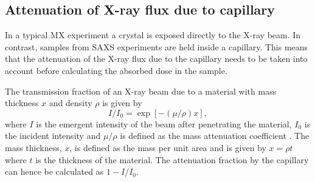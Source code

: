 \subsection{Attenuation of X-ray flux due to capillary}
\label{sub:Attenuation of X-ray flux due to capillary}
In a typical MX experiment a crystal is exposed directly to the X-ray beam.
In contrast, samples from SAXS experiments are held inside a capillary.
This means that the attenuation of the X-ray flux due to the capillary needs to be taken into account before calculating the absorbed dose in the sample.

The transmission fraction of an X-ray beam due to a material with mass thickness $x$ and density $\rho$ is given by
\begin{equation}
    I/I_0 = \exp \left[ -(\mu/\rho)x\right],
    \label{eq:capillary transmission fraction}
\end{equation}
where $I$ is the emergent intensity of the beam after penetrating the material, $I_0$ is the incident intensity and $\mu/\rho$ is defined as the mass attenuation coefficient \cite{hubbell1995tables}.
The mass thickness, $x$, is defined as the mass per unit area and is given by $x = \rho t$ where $t$ is the thickness of the material.
The attenuation fraction by the capillary can hence be calculated as $1 - I/I_0$.

